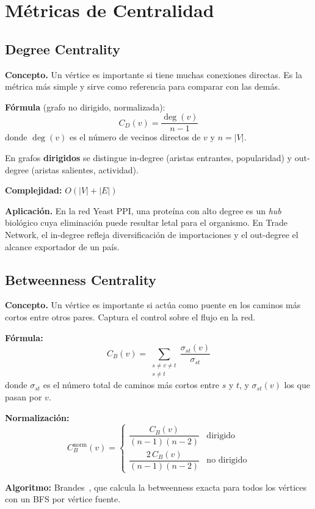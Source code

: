 \section{Métricas de Centralidad}

\subsection{Degree Centrality}

\textbf{Concepto.} Un vértice es importante si tiene muchas conexiones directas.
Es la métrica más simple y sirve como referencia para comparar con las demás.

\textbf{Fórmula} (grafo no dirigido, normalizada):
\[
C_D(v) = \frac{\deg(v)}{n - 1}
\]
donde $\deg(v)$ es el número de vecinos directos de $v$ y $n = |V|$.

En grafos \textbf{dirigidos} se distingue in-degree (aristas entrantes, popularidad)
y out-degree (aristas salientes, actividad).

\textbf{Complejidad:} $O(|V| + |E|)$

\textbf{Aplicación.} En la red Yeast PPI, una proteína con alto degree es un
\textit{hub} biológico cuya eliminación puede resultar letal para el organismo.
En Trade Network, el in-degree refleja diversificación de importaciones y el
out-degree el alcance exportador de un país.

\subsection{Betweenness Centrality}

\textbf{Concepto.} Un vértice es importante si actúa como puente en los caminos
más cortos entre otros pares. Captura el control sobre el flujo en la red.

\textbf{Fórmula:}
\[
C_B(v) = \sum_{\substack{s \neq v \neq t \\ s \neq t}}
         \frac{\sigma_{st}(v)}{\sigma_{st}}
\]
donde $\sigma_{st}$ es el número total de caminos más cortos entre $s$ y $t$,
y $\sigma_{st}(v)$ los que pasan por $v$.

\textbf{Normalización:}
\[
C_B^{\text{norm}}(v) =
\begin{cases}
\dfrac{C_B(v)}{(n-1)(n-2)} & \text{dirigido} \\[8pt]
\dfrac{2\,C_B(v)}{(n-1)(n-2)} & \text{no dirigido}
\end{cases}
\]

\textbf{Algoritmo:} Brandes~\cite{brandes2001}, que calcula la betweenness exacta
para todos los vértices con un BFS por vértice fuente.

